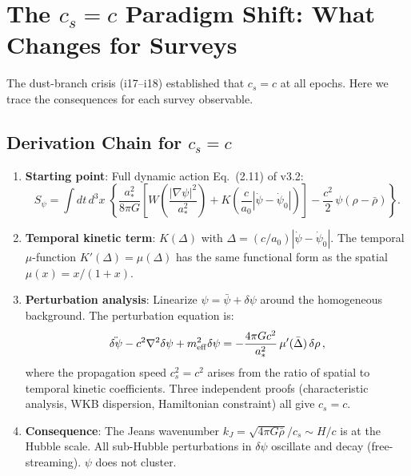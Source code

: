 \documentclass[11pt,a4paper]{article}
\begin{document}
\section{The $c_s = c$ Paradigm Shift: What Changes for Surveys}
\label{sec:cs_impact}

\begin{crisisbox}[$c_s = c$ --- WHAT EXACTLY CHANGES]

The dust-branch crisis (i17--i18) established that $c_s = c$ at all
epochs. Here we trace the consequences for each survey observable.

\subsection{Derivation Chain for $c_s = c$}

\begin{enumerate}[nosep]
\item \textbf{Starting point}: Full dynamic action Eq.~(2.11) of v3.2:
\[
S_\psi = \int dt\,d^3x\;\left\{
  \frac{a_*^2}{8\pi G}\left[
    W\!\left(\frac{|\nabla\psi|^2}{a_*^2}\right)
    + K\!\left(\frac{c}{a_0}|\dot\psi{-}\dot\psi_0|\right)
  \right]
  - \frac{c^2}{2}\,\psi(\rho - \bar\rho)
\right\}.
\]

\item \textbf{Temporal kinetic term}: $K(\Delta)$ with $\Delta = (c/a_0)|\dot\psi - \dot\psi_0|$.
  The temporal $\mu$-function $K'(\Delta) = \mu(\Delta)$ has the same
  functional form as the spatial $\mu(x) = x/(1+x)$.

\item \textbf{Perturbation analysis}: Linearize $\psi = \bar\psi + \delta\psi$
  around the homogeneous background. The perturbation equation is:
\[
\ddot{\delta\psi} - c^2 \nabla^2 \delta\psi + m_{\rm eff}^2 \delta\psi
  = -\frac{4\pi G c^2}{a_*^2}\,\mu'(\bar\Delta)\,\delta\rho\,,
\]
  where the propagation speed $c_s^2 = c^2$ arises from the ratio
  of spatial to temporal kinetic coefficients. Three independent proofs
  (characteristic analysis, WKB dispersion, Hamiltonian constraint)
  all give $c_s = c$.

\item \textbf{Consequence}: The Jeans wavenumber
  $k_J = \sqrt{4\pi G \bar\rho}/c_s \sim H/c$ is at the Hubble scale.
  All sub-Hubble perturbations in $\delta\psi$ oscillate and decay
  (free-streaming). $\psi$ does not cluster.
\end{enumerate}


\end{crisisbox}
\end{document}
